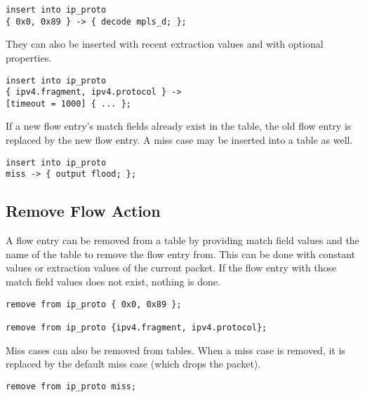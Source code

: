 \begin{codepage}
\begin{lstlisting}
insert into ip_proto
{ 0x0, 0x89 } -> { decode mpls_d; };
\end{lstlisting}
\end{codepage}

They can also be inserted with recent extraction values and with
optional properties.

\begin{codepage}
\begin{lstlisting}
insert into ip_proto
{ ipv4.fragment, ipv4.protocol } ->
[timeout = 1000] { ... };
\end{lstlisting}
\end{codepage}

If a new flow entry's match fields already exist in the table, the old flow
entry is replaced by the new flow entry. A miss case may be inserted into a
table as well.

\begin{codepage}
\begin{lstlisting}
insert into ip_proto
miss -> { output flood; };
\end{lstlisting}
\end{codepage}

\subsection{Remove Flow Action} \label{tut:remove_flow_action}

A flow entry can be removed from a table by providing match field values and the
name of the table to remove the flow entry from. This can be done with constant
values or extraction values of the current packet. If the flow entry with
those match field values does not exist, nothing is done.

\begin{codepage}
\begin{lstlisting}
remove from ip_proto { 0x0, 0x89 };

remove from ip_proto {ipv4.fragment, ipv4.protocol};
\end{lstlisting}
\end{codepage}

Miss cases can also be removed from tables. When a miss case is removed, it is
replaced by the default miss case (which drops the packet).

\begin{codepage}
\begin{lstlisting}
remove from ip_proto miss;
\end{lstlisting}
\end{codepage}

